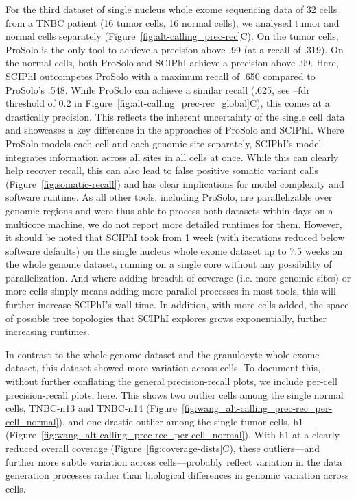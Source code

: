 \documentclass[authoryear,preprint,11pt]{scrartcl}
\begin{document}
For the third dataset of single nucleus whole exome sequencing data of 32 cells from a TNBC patient (16 tumor cells, 16 normal cells), we analysed tumor and normal cells separately (Figure~\ref{fig:alt-calling_prec-rec}C).
On the tumor cells, ProSolo is the only tool to achieve a precision above .99 (at a recall of .319).
On the normal cells, both ProSolo and SCIPhI achieve a precision above .99.
Here, SCIPhI outcompetes ProSolo with a maximum recall of .650 compared to ProSolo's .548.
While ProSolo can achieve a similar recall (.625, see {\ttfamily --fdr} threshold of 0.2 in Figure~\ref{fig:alt-calling_prec-rec_global}C), this comes at a drastically precision.
This reflects the inherent uncertainty of the single cell data and showcases a key difference in the approaches of ProSolo and SCIPhI.
Where ProSolo models each cell and each genomic site separately, SCIPhI's model integrates information across all sites in all cells at once.
While this can clearly help recover recall, this can also lead to false positive somatic variant calls (Figure~\ref{fig:somatic-recall}) and has clear implications for model complexity and software runtime.
As all other tools, including ProSolo, are parallelizable over genomic regions and were thus able to process both datasets within days on a multicore machine, we do not report more detailed runtimes for them.
However, it should be noted that SCIPhI took from 1 week (with iterations reduced below software defaults) on the single nucleus whole exome dataset up to 7.5 weeks on the whole genome dataset, running on a single core without any possibility of parallelization.
And where adding breadth of coverage (i.e. more genomic sites) or more cells simply means adding more parallel processes in most tools, this will further increase SCIPhI's wall time.
In addition, with more cells added, the space of possible tree topologies that SCIPhI explores grows exponentially, further increasing runtimes.

In contrast to the whole genome dataset and the granulocyte whole exome dataset, this dataset showed more variation across cells.
To document this, without further conflating the general precision-recall plots, we include per-cell precision-recall plots, here.
This shows two outlier cells among the single normal cells, TNBC-n13 and TNBC-n14 (Figure~\ref{fig:wang_alt-calling_prec-rec_per-cell_normal}), and one drastic outlier among the single tumor cells, h1 (Figure~\ref{fig:wang_alt-calling_prec-rec_per-cell_normal}).
With h1 at a clearly reduced overall coverage (Figure~\ref{fig:coverage-dists}C), these outliers---and further more subtle variation across cells---probably reflect variation in the data generation processes rather than biological differences in genomic variation across cells.
\end{document}
